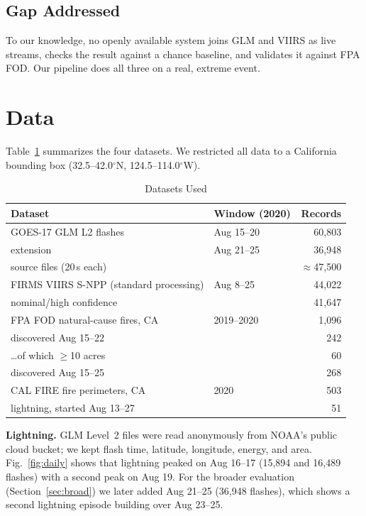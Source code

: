 \documentclass[10pt,journal,compsoc]{IEEEtran}
\begin{document}
\subsection{Gap Addressed}
To our knowledge, no openly available system joins GLM and VIIRS as live streams, checks the result against a chance baseline, and validates it against FPA FOD. Our pipeline does all three on a real, extreme event.

\section{Data}

Table~\ref{tab:data} summarizes the four datasets. We restricted all data to a California bounding box (32.5--42.0$^\circ$N, 124.5--114.0$^\circ$W).

\begin{table}[!t]
\caption{Datasets Used}
\label{tab:data}
\centering
\footnotesize
\setlength{\tabcolsep}{3pt}
\begin{tabular}{@{}p{4.3cm}lr@{}}
\toprule
Dataset & Window (2020) & Records \\
\midrule
GOES-17 GLM L2 flashes & Aug 15--20 & 60,803 \\
\quad extension & Aug 21--25 & 36,948 \\
\quad source files (20\,s each) & & $\approx$47,500 \\
FIRMS VIIRS S-NPP (standard processing) & Aug 8--25 & 44,022 \\
\quad nominal/high confidence & & 41,647 \\
FPA FOD natural-cause fires, CA & 2019--2020 & 1,096 \\
\quad discovered Aug 15--22 & & 242 \\
\quad \ldots of which $\geq$10 acres & & 60 \\
\quad discovered Aug 15--25 & & 268 \\
CAL FIRE fire perimeters, CA & 2020 & 503 \\
\quad lightning, started Aug 13--27 & & 51 \\
\bottomrule
\end{tabular}
\end{table}

\textbf{Lightning.} GLM Level~2 files were read anonymously from NOAA's public cloud bucket; we kept flash time, latitude, longitude, energy, and area. Fig.~\ref{fig:daily} shows that lightning peaked on Aug 16--17 (15,894 and 16,489 flashes) with a second peak on Aug 19. For the broader evaluation (Section~\ref{sec:broad}) we later added Aug 21--25 (36,948 flashes), which shows a second lightning episode building over Aug 23--25.
\end{document}
